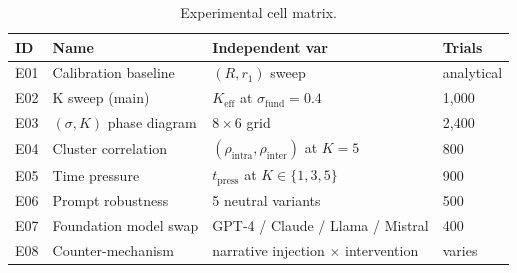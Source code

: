 \begin{table}[h]
\centering
\caption{Experimental cell matrix.}
\label{tab:cells}
\begin{tabular}{llll}
\toprule
ID & Name & Independent var & Trials \\
\midrule
E01 & Calibration baseline & $(R, r_1)$ sweep & analytical \\
E02 & K sweep (main) & $K_{\text{eff}}$ at $\sigma_{\text{fund}}=0.4$ & 1{,}000 \\
E03 & $(\sigma, K)$ phase diagram & $8 \times 6$ grid & 2{,}400 \\
E04 & Cluster correlation & $(\rho_{\text{intra}}, \rho_{\text{inter}})$ at $K{=}5$ & 800 \\
E05 & Time pressure & $t_{\text{press}}$ at $K \in \{1,3,5\}$ & 900 \\
E06 & Prompt robustness & 5 neutral variants & 500 \\
E07 & Foundation model swap & GPT-4 / Claude / Llama / Mistral & 400 \\
E08 & Counter-mechanism & narrative injection $\times$ intervention & varies \\
\bottomrule
\end{tabular}
\end{table}
